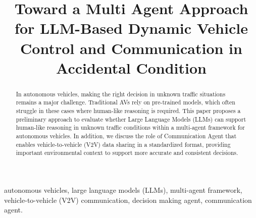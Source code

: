 \documentclass[conference]{IEEEtran}
\begin{document}

\title{Toward a Multi Agent Approach for LLM-Based Dynamic Vehicle Control and Communication in Accidental Condition}



\maketitle

\begin{abstract}
In autonomous vehicles, making the right decision in unknown traffic situations remains a major challenge. Traditional AVs rely on pre-trained models, which often struggle in these cases where human-like reasoning is required. This paper proposes a preliminary approach to evaluate whether Large Language Models (LLMs) can support human-like reasoning in unknown traffic conditions within a multi-agent framework for autonomous vehicles. 
In addition, we discuss the role of Communication Agent that enables vehicle-to-vehicle (V2V) data sharing in a standardized format, providing important environmental context to support more accurate and consistent decisions.
\end{abstract}

\begin{IEEEkeywords}
autonomous vehicles, large language models (LLMs), multi-agent framework, vehicle-to-vehicle (V2V) communication, decision making agent, communication agent.

\end{IEEEkeywords}
\end{document}

